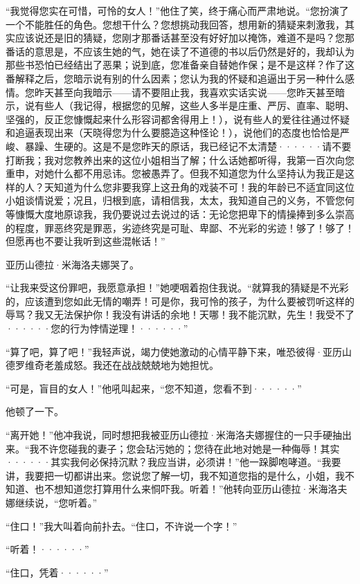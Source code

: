\documentclass[12pt, UTF8]{ctexbook}
\begin{document}
\par “我觉得您实在可惜，可怜的女人！”他住了笑，终于痛心而严肃地说。“您扮演了一个不能胜任的角色。您想干什么？您想挑动我回答，想用新的猜疑来刺激我，其实应该说还是旧的猜疑，您刚才那番话甚至没有好好加以掩饰，难道不是吗？您那番话的意思是，不应该生她的气，她在读了不道德的书以后仍然是好的，我却认为那些书恐怕已经结出了恶果；说到底，您准备亲自替她作保；是不是这样？作了这番解释之后，您暗示说有别的什么因素；您认为我的怀疑和追逼出于另一种什么感情。您昨天甚至向我暗示——请不要阻止我，我喜欢实话实说——您昨天甚至暗示，说有些人（我记得，根据您的见解，这些人多半是庄重、严厉、直率、聪明、坚强的，反正您慷慨起来什么形容词都舍得用上！），说有些人的爱往往通过怀疑和追逼表现出来（天晓得您为什么要臆造这种怪论！），说他们的态度也恰恰是严峻、暴躁、生硬的。这是不是您昨天的原话，我已经记不太清楚······请不要打断我；我对您教养出来的这位小姐相当了解；什么话她都听得，我第一百次向您重申，对她什么都不用忌讳。您被愚弄了。但我不知道您为什么坚持认为我正是这样的人？天知道为什么您非要我穿上这丑角的戏装不可！我的年龄已不适宜同这位小姐谈情说爱；况且，归根到底，请相信我，太太，我知道自己的义务，不管您何等慷慨大度地原谅我，我仍要说过去说过的话：无论您把卑下的情操捧到多么崇高的程度，罪恶终究是罪恶，劣迹终究是可耻、卑鄙、不光彩的劣迹！够了！够了！但愿再也不要让我听到这些混帐话！”
\par 亚历山德拉·米海洛夫娜哭了。
\par “让我来受这份罪吧，我愿意承担！”她哽咽着抱住我说。“就算我的猜疑是不光彩的，应该遭到您如此无情的嘲弄！可是你，我可怜的孩子，为什么要被罚听这样的辱骂？我又无法保护你！我没有讲话的余地！天哪！我不能沉默，先生！我受不了······您的行为悖情逆理！······”
\par “算了吧，算了吧！”我轻声说，竭力使她激动的心情平静下来，唯恐彼得·亚历山德罗维奇老羞成怒。我还在战战兢兢地为她担忧。
\par “可是，盲目的女人！”他吼叫起来，“您不知道，您看不到······”
\par 他顿了一下。
\par “离开她！”他冲我说，同时想把我被亚历山德拉·米海洛夫娜握住的一只手硬抽出来。“我不许您碰我的妻子；您会玷污她的；您待在此地对她是一种侮辱！其实······其实我何必保持沉默？我应当讲，必须讲！”他一跺脚咆哮道。“我要讲，我要把一切都讲出来。您说您了解一切，我不知道您指的是什么，小姐，我不知道、也不想知道您打算用什么来恫吓我。听着！”他转向亚历山德拉·米海洛夫娜继续说，“您听着。”
\par “住口！”我大叫着向前扑去。“住口，不许说一个字！”
\par “听着！······”
\par “住口，凭着······”
\end{document}
